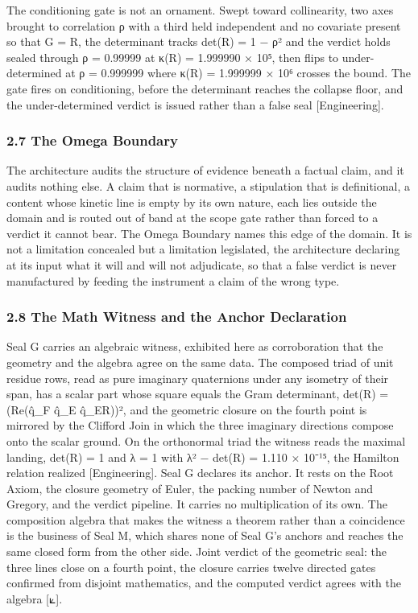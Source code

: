 \documentclass[10pt,twocolumn]{article}
\begin{document}
The conditioning gate is not an ornament. Swept toward collinearity, two
axes brought to correlation ρ with a third held independent and no
covariate present so that G = R, the determinant tracks det(R) = 1 − ρ²
and the verdict holds sealed through ρ = 0.99999 at κ(R) = 1.999990 ×
10⁵, then flips to under-determined at ρ = 0.999999 where κ(R) =
1.999999 × 10⁶ crosses the bound. The gate fires on conditioning, before
the determinant reaches the collapse floor, and the under-determined
verdict is issued rather than a false seal {[}Engineering{]}.

\hypertarget{the-omega-boundary}{%
\subsubsection{2.7 The Omega Boundary}\label{the-omega-boundary}}

The architecture audits the structure of evidence beneath a factual
claim, and it audits nothing else. A claim that is normative, a
stipulation that is definitional, a content whose kinetic line is empty
by its own nature, each lies outside the domain and is routed out of
band at the scope gate rather than forced to a verdict it cannot bear.
The Omega Boundary names this edge of the domain. It is not a limitation
concealed but a limitation legislated, the architecture declaring at its
input what it will and will not adjudicate, so that a false verdict is
never manufactured by feeding the instrument a claim of the wrong type.

\hypertarget{the-math-witness-and-the-anchor-declaration}{%
\subsubsection{2.8 The Math Witness and the Anchor
Declaration}\label{the-math-witness-and-the-anchor-declaration}}

Seal G carries an algebraic witness, exhibited here as corroboration
that the geometry and the algebra agree on the same data. The composed
triad of unit residue rows, read as pure imaginary quaternions under any
isometry of their span, has a scalar part whose square equals the Gram
determinant, det(R) = (Re(q̂\_F q̂\_E q̂\_ER))², and the geometric closure
on the fourth point is mirrored by the Clifford Join in which the three
imaginary directions compose onto the scalar ground. On the orthonormal
triad the witness reads the maximal landing, det(R) = 1 and
\textbar λ\textbar{} = 1 with \textbar λ² − det(R)\textbar{} = 1.110 ×
10⁻¹⁵, the Hamilton relation realized {[}Engineering{]}. Seal G declares
its anchor. It rests on the Root Axiom, the closure geometry of Euler,
the packing number of Newton and Gregory, and the verdict pipeline. It
carries no multiplication of its own. The composition algebra that makes
the witness a theorem rather than a coincidence is the business of Seal
M, which shares none of Seal G's anchors and reaches the same closed
form from the other side. Joint verdict of the geometric seal: the three
lines close on a fourth point, the closure carries twelve directed gates
confirmed from disjoint mathematics, and the computed verdict agrees
with the algebra {[}⟀{]}.
\end{document}
